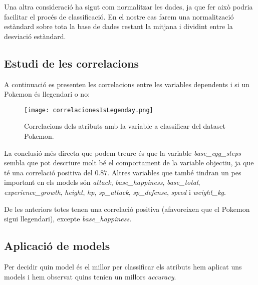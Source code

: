 \documentclass[a4paper, 11pt]{article}
\begin{document}
    Una altra consideració ha sigut com normalitzar les dades, ja que fer això podria facilitar el procés de classificació. En el nostre cas farem una normalització estàndard sobre tota la base de dades restant la mitjana i dividint entre la desviació estàndard.

    \newpage
    \subsection{Estudi de les correlacions}

    A continuació es presenten les correlacions entre les variables dependents i si un Pokemon és
    llegendari o no:

    \begin{figure}[H]
        \centering
        \texttt{[image: correlacionesIsLegenday.png]}
        \caption{Correlacions dels atributs amb la variable a classificar del dataset Pokemon.}
    \end{figure}

    La conclusió més directa que podem treure és que la variable \textit{base\_egg\_steps}
    sembla que pot descriure molt bé el comportament de la variable objectiu, ja que té una
    correlació positiva del $0.87$. Altres variables que també tindran un pes important en
    els models són \textit{attack}, \textit{base\_happiness}, \textit{base\_total}, \textit{experience\_growth},
    \textit{height}, \textit{hp}, \textit{sp\_attack}, \textit{sp\_defense}, \textit{speed}
    i \textit{weight\_kg}.

    De les anteriors totes tenen una correlació positiva (afavoreixen que el Pokemon sigui llegendari), excepte \textit{base\_happiness}.

    \newpage
    \subsection{Aplicació de models}
    Per decidir quin model és el millor per classificar els atributs hem aplicat uns models i hem observat quins tenien un millors \textit{accuracy}.
\end{document}
